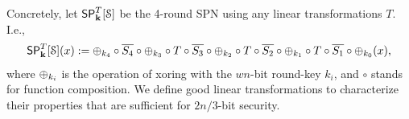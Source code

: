 \documentclass[journal=tosc,final,nohyperref]{iacrtrans}
\begin{document}
Concretely, let $\mathsf{SP}_{\mathbf{k}}^T[\mathcal{S}]$ be the 4-round SPN using any linear transformations $T$. I.e.,
%
\begin{align}
\mathsf{SP}_{\mathbf{k}}^T[\mathcal{S}](x):=
\oplus_{k_4}\circ\overline{S_4}\circ
\oplus_{k_3}\circ T\circ\overline{S_3}\circ
\oplus_{k_2}\circ T\circ\overline{S_2}\circ
\oplus_{k_1}\circ T\circ\overline{S_1}\circ
\oplus_{k_0}(x),
\label{eq:defn-4-round-spn}
\end{align}
%
where $\oplus_{k_i}$ is the operation of xoring with the $wn$-bit round-key $k_i$, and $\circ$ stands for function composition. We define good linear transformations to characterize their properties that are sufficient for $2n/3$-bit security.
\end{document}
